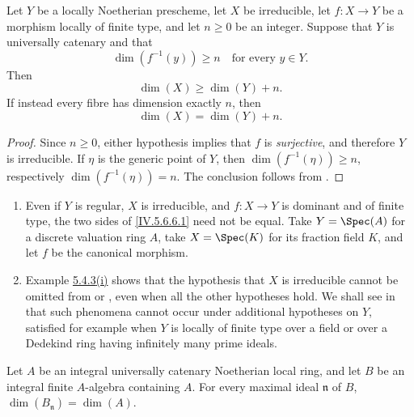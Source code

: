 \begin{corollary}[5.6.8]
\label{IV.5.6.8}
Let $Y$ be a locally Noetherian prescheme, let $X$ be \textup{irreducible},
let $f:X\to Y$ be a morphism locally of finite type, and let
$n\geq0$ be an integer.  Suppose that $Y$ is universally catenary
and that
\[
\dim(f^{-1}(y))\geq n
\quad\text{for every }y\in Y.
\]
Then
\begin{equation}
\dim(X)\geq\dim(Y)+n.
\tag{5.6.8.1}\label{IV.5.6.8.1}
\end{equation}
If instead every fibre has dimension exactly $n$, then
\begin{equation}
\dim(X)=\dim(Y)+n.
\tag{5.6.8.2}\label{IV.5.6.8.2}
\end{equation}
\end{corollary}

\begin{proof}
Since $n\geq0$, either hypothesis implies that $f$ is \emph{surjective},
and therefore $Y$ is irreducible.  If $\eta$ is the generic point of
$Y$, then $\dim(f^{-1}(\eta))\geq n$, respectively
$\dim(f^{-1}(\eta))=n$.  The conclusion follows from
.
\end{proof}

\begin{remarks}[5.6.9]
\label{IV.5.6.9}
\begin{enumerate}[{\rm(i)}]
\item
{}
\label{IV.5.6.9.i}
Even if $Y$ is regular, $X$ is irreducible, and $f:X\to Y$ is
dominant and of finite type, the two sides of
\eqref{IV.5.6.6.1} need not be equal.  Take
$Y=\Spec(A)$ for a discrete valuation ring $A$, take
$X=\Spec(K)$ for its fraction field $K$, and let $f$ be the
canonical morphism.

\item
{}
\label{IV.5.6.9.ii}
Example {\hyperref[IV.5.4.3.i]{5.4.3\textup{(i)}}} shows that the
hypothesis that $X$ is
irreducible cannot be omitted from  or
, even when all the other hypotheses hold.  We shall
see in  that such phenomena cannot occur under
additional hypotheses on $Y$, satisfied for example when $Y$ is
locally of finite type over a field or over a Dedekind ring having
infinitely many prime ideals.
\end{enumerate}
\end{remarks}

\begin{proposition}[5.6.10]
\label{IV.5.6.10}
Let $A$ be an integral universally catenary Noetherian local ring,
and let $B$ be an integral finite $A$-algebra containing $A$.  For
every maximal ideal $\mathfrak n$ of $B$, $\dim(B_{\mathfrak n})=\dim(A)$.
\end{proposition}

